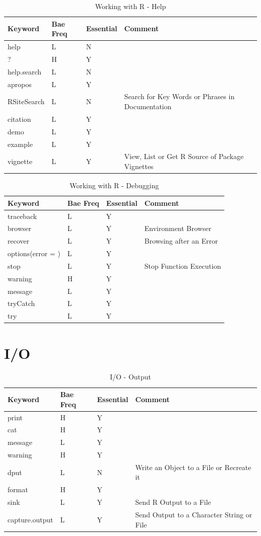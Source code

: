 \documentclass[11pt,]{krantz}
\theoremstyle{definition}
\theoremstyle{definition}
\theoremstyle{remark}
\begin{document}
\begin{longtable}[t]{llll}
\caption{\label{tab:knitchunk22}Working with R - Help}\\
\toprule
Keyword & Bae Freq & Essential & Comment\\
\midrule
help & L & N & \\
? & H & Y & \\
help.search & L & N & \\
apropos & L & Y & \\
RSiteSearch & L & N & Search for Key Words or Phrases in Documentation\\
\addlinespace
citation & L & Y & \\
demo & L & Y & \\
example & L & Y & \\
vignette & L & Y & View, List or Get R Source of Package Vignettes\\
\bottomrule
\end{longtable}

\begin{longtable}[t]{llll}
\caption{\label{tab:knitchunk23}Working with R - Debugging}\\
\toprule
Keyword & Bae Freq & Essential & Comment\\
\midrule
traceback & L & Y & \\
browser & L & Y & Environment Browser\\
recover & L & Y & Browsing after an Error\\
options(error = ) & L & Y & \\
stop & L & Y & Stop Function Execution\\
\addlinespace
warning & H & Y & \\
message & L & Y & \\
tryCatch & L & Y & \\
try & L & Y & \\
\bottomrule
\end{longtable}

\section{I/O}\label{io}

\begin{longtable}[t]{llll}
\caption{\label{tab:knitchunk24}I/O - Output}\\
\toprule
Keyword & Bae Freq & Essential & Comment\\
\midrule
print & H & Y & \\
cat & H & Y & \\
message & L & Y & \\
warning & H & Y & \\
dput & L & N & Write an Object to a File or Recreate it\\
\addlinespace
format & H & Y & \\
sink & L & Y & Send R Output to a File\\
capture.output & L & Y & Send Output to a Character String or File\\
\bottomrule
\end{longtable}
\end{document}
